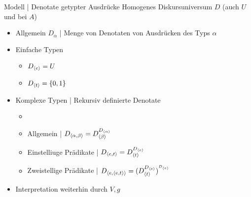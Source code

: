 \begin{frame}
  {Modell | Denotate getypter Ausdrücke}
  \onslide<+->
  \onslide<+->
  Homogenes Diskursuniversum $D$ (auch $U$ und bei \citealt{DowtyEa1981} $A$)\\
  \Halbzeile
  \begin{itemize}[<+->]
    \item Allgemein $D_{\alpha}$ | Menge von Denotaten von Ausdrücken des Typs $\alpha$
      \Halbzeile
    \item Einfache Typen
      \begin{itemize}[<+->]
        \item \alert{$D_{{\langle{}e\rangle}} = U$}
        \item \alert{$D_{{\langle{}t\rangle}} = \{0,1\}$}
      \end{itemize}
      \Halbzeile
    \item Komplexe Typen | Rekursiv definierte Denotate
      \begin{itemize}[<+->]
        \item 
          \item Allgemein | \alert{$D_{{\langle{}\alpha,\beta\rangle}}=D_{{\langle{}\beta\rangle}}^{D_{{\langle{}\alpha\rangle}}}$}
          \item Einstelliuge Prädikate | $D_{{\langle{}e,t\rangle}}=D_{{\langle{}t\rangle}}^{D_{{\langle{}e\rangle}}}$
          \item Zweistellige Prädikate | $D_{{\langle{}e,{\langle{}e,t\rangle}\rangle}}=(D_{{\langle{}t\rangle}}^{D_{{\langle{}e\rangle}}})^{^{D_{{\langle{}e\rangle}}}}$
      \end{itemize}
      \Halbzeile
    \item Interpretation weiterhin durch $V,g$
  \end{itemize}
\end{frame}


